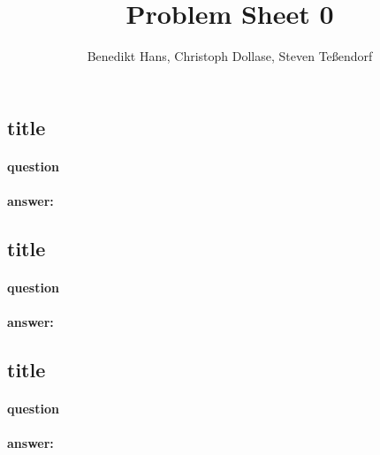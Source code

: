 \documentclass[a4paper,12pt]{article}
\author{Benedikt Hans, Christoph Dollase, Steven Teßendorf}
\title{ \textbf{Problem Sheet 0}}
\begin{document}
	 
 \maketitle	 %
 
 \subsection{title}
 \paragraph{question}
 \paragraph{answer:}
 
 
 \subsection{title}
 \paragraph{question}
 \paragraph{answer:}
 
 
 \subsection{title}
 \paragraph{question}
 \paragraph{answer:}
 
\end{document}
